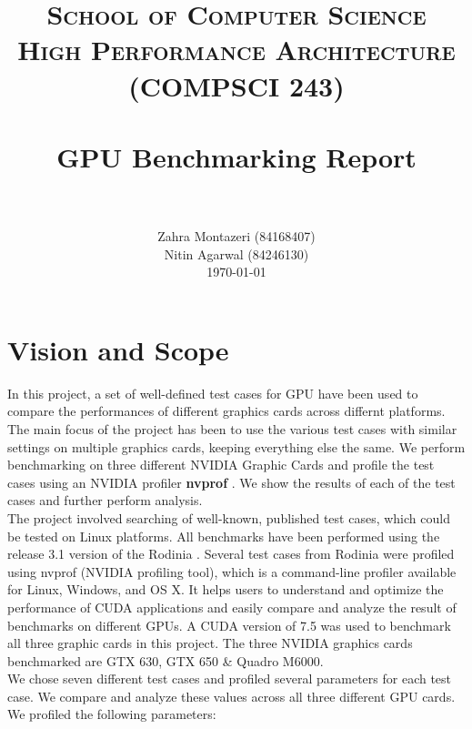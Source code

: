 \documentclass[paper=a4, fontsize=11pt]{scrartcl}
\title{
		\usefont{OT1}{bch}{b}{n}
		\normalfont \normalsize \textsc{School of Computer Science} \\ 
        \normalsize \textsc{High Performance Architecture (COMPSCI 243)} \\
        [25pt]
		\horrule{0.5pt} \\[0.4cm]
		\huge GPU Benchmarking Report \\
		\horrule{2pt} \\[0.5cm]
}
\author{
		\normalfont 								
        \normalsize
        Zahra Montazeri (84168407) \\[-3pt]		
        \normalsize 
        \newline
        \normalsize
        Nitin Agarwal (84246130) \\[-3pt]		
        \normalsize 
        \newline
        \newline
        \today
}
\date{}
\numberwithin{equation}{section}		%
\numberwithin{figure}{section}			%
\numberwithin{table}{section}				%
\begin{document}
\maketitle
\newpage
\tableofcontents
\newpage
\section{Vision and Scope}
In this project, a set of well-defined test cases for GPU have been used to compare the performances of different graphics cards across differnt platforms. The main focus of the project has been to use the various test cases with similar settings on multiple graphics cards, keeping everything else the same. We perform benchmarking on three different NVIDIA Graphic Cards and profile the test cases using an NVIDIA profiler \textbf{nvprof} \cite{nvprof}. We show the results of each of the test cases and further perform analysis.\\

The project involved searching of well-known, published test cases, which could be tested on Linux platforms. All benchmarks have been performed using the release 3.1 version of the Rodinia \cite{rodinia}. Several test cases from Rodinia were profiled using nvprof (NVIDIA profiling tool), which is a command-line profiler available for Linux, Windows, and OS X. It helps users to understand and optimize the performance of CUDA applications and easily compare and analyze the result of benchmarks on different GPUs\cite{CUDA}. A CUDA version of 7.5 was used to benchmark all three graphic cards in this project. The three NVIDIA graphics cards benchmarked are GTX 630, GTX 650 \& Quadro M6000.\\

We chose seven different test cases and profiled several parameters for each test case. We compare and analyze these values across all three different GPU cards. We profiled the following parameters:
\end{document}
